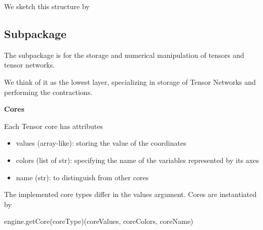 We sketch this structure by
\begin{center}
\end{center}



\subsection{Subpackage \spengine}

The \spengine subpackage is for the storage and numerical manipulation of tensors and tensor networks.

We think of it as the lowest layer, specializing in storage of Tensor Networks and performing the contractions.

\textbf{Cores}

Each Tensor core has attributes
\begin{itemize}
	\item values (array-like): storing the value of the coordinates
	\item colors (list of str): specifying the name of the variables represented by its axes
	\item name (str): to distinguish from other cores
\end{itemize} 
The implemented core types differ in the values argument.
Cores are instantiated by
\begin{centeredcode}
	engine.getCore(coreType)(coreValues, coreColors, coreName)
\end{centeredcode}

